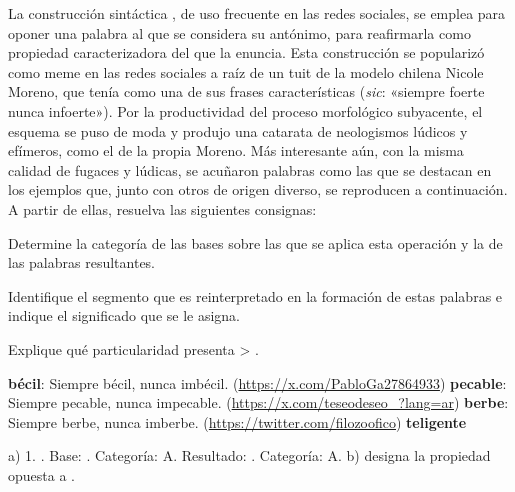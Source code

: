 \begin{ejercicio}\label{ej:04-siempre}
La construcción sintáctica , de uso frecuente en las
redes sociales, se emplea para oponer una palabra al que se considera su
antónimo, para reafirmarla como propiedad caracterizadora del que la enuncia.
Esta construcción se popularizó como meme en las redes sociales a raíz de un tuit
de la modelo chilena Nicole Moreno, que tenía como una de sus frases
características  (\textit{sic}: «siempre
foerte nunca infoerte»). Por la productividad del proceso morfológico
subyacente, el esquema se puso de moda y produjo una catarata de neologismos
lúdicos y efímeros, como el de la propia Moreno. Más interesante aún, con la
misma calidad de fugaces y lúdicas, se acuñaron palabras como las que se
destacan en los ejemplos que, junto con otros de origen diverso, se reproducen a
continuación. A partir de ellas, resuelva las siguientes consignas:

\begin{consignas}
  \item Determine la categoría de las bases sobre las que se aplica esta
        operación y la de las palabras resultantes.
  \item Identifique el segmento que es reinterpretado en la formación de estas
        palabras e indique el significado que se le asigna.
  \item Explique qué particularidad presenta  > .
\end{consignas}

\begin{exe}
  \ex \textbf{bécil}: Siempre bécil, nunca imbécil.
      (\url{https://x.com/PabloGa27864933})
  \ex \textbf{pecable}: Siempre pecable, nunca impecable.
      (\url{https://x.com/teseodeseo_?lang=ar})
  \ex \textbf{berbe}: Siempre berbe, nunca imberbe.
      (\url{https://twitter.com/filozoofico})
  \ex \textbf{teligente}
\end{exe}

\begin{resuelto}
a) 1. . Base: . Categoría: A. Resultado:
. Categoría: A. b)  designa la propiedad opuesta a
.
\end{resuelto}
\end{ejercicio}

